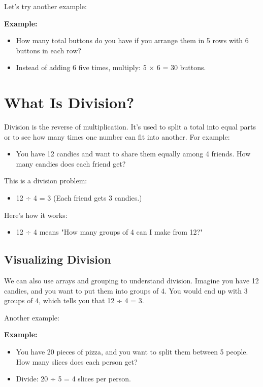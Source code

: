 Let’s try another example:

\textbf{Example:}
\begin{itemize}
    \item How many total buttons do you have if you arrange them in 5 rows with 6 buttons in each row?
    \item Instead of adding 6 five times, multiply: 5 × 6 = 30 buttons.
\end{itemize}

\section{What Is Division?}
Division is the reverse of multiplication. It’s used to split a total into equal parts or to see how many times one number can fit into another. For example:
\begin{itemize}
    \item You have 12 candies and want to share them equally among 4 friends. How many candies does each friend get?
\end{itemize}

This is a division problem:
\begin{itemize}
    \item 12 ÷ 4 = 3 (Each friend gets 3 candies.)
\end{itemize}

Here’s how it works:
\begin{itemize}
    \item 12 ÷ 4 means "How many groups of 4 can I make from 12?"
\end{itemize}

\subsection{Visualizing Division}
We can also use arrays and grouping to understand division. Imagine you have 12 candies, and you want to put them into groups of 4. You would end up with 3 groups of 4, which tells you that 12 ÷ 4 = 3.

Another example:

\textbf{Example:}
\begin{itemize}
    \item You have 20 pieces of pizza, and you want to split them between 5 people. How many slices does each person get?
    \item Divide: 20 ÷ 5 = 4 slices per person.
\end{itemize}

